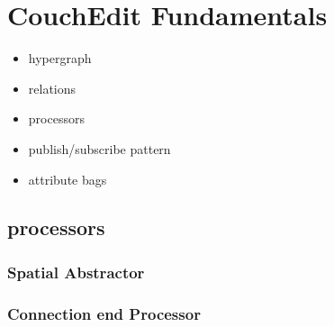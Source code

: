 \chapter{CouchEdit Fundamentals}


\begin{itemize}
  \item hypergraph
  \item relations
  \item processors
  \item publish/subscribe pattern
  \item attribute bags
\end{itemize}

\section{processors}

\subsection{Spatial Abstractor}

\subsection{Connection end Processor}